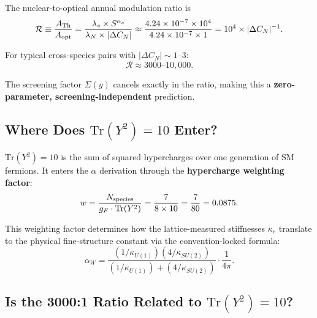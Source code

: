 \documentclass[11pt]{article}
\theoremstyle{definition}
\theoremstyle{remark}
\begin{document}
The nuclear-to-optical annual modulation ratio is
\begin{equation}\label{eq:ratio-master}
\mathcal{R} \equiv \frac{A_{\rm Th}}{A_{\rm opt}}
= \frac{\lambda_s \times S^{\alpha_s}}{\lambda_N \times |\Delta C_N|}
\approx \frac{4.24 \times 10^{-7} \times 10^4}
       {4.24 \times 10^{-7} \times 1}
= 10^4 \times |\Delta C_N|^{-1}.
\end{equation}

For typical cross-species pairs with $|\Delta C_N| \sim 1$--3:
\begin{equation}
\boxed{\mathcal{R} \approx 3000\text{--}10{,}000.}
\end{equation}

The screening factor $\Sigma(y)$ cancels exactly in the ratio, making this
a \textbf{zero-parameter, screening-independent} prediction.

\subsection{Where Does $\mathrm{Tr}(Y^2) = 10$ Enter?}

$\mathrm{Tr}(Y^2) = 10$ is the sum of squared hypercharges over one
generation of SM fermions. It enters the $\alpha$ derivation through the
\textbf{hypercharge weighting factor}:
\begin{equation}
w = \frac{N_{\rm species}}{g_F \cdot \mathrm{Tr}(Y^2)}
= \frac{7}{8 \times 10} = \frac{7}{80} = 0.0875.
\end{equation}

This weighting factor determines how the lattice-measured stiffnesses
$\kappa_r$ translate to the physical fine-structure constant via the
convention-locked formula:
\begin{equation}
\alpha_W = \frac{(1/\kappa_{U(1)})(4/\kappa_{SU(2)})}
{(1/\kappa_{U(1)}) + (4/\kappa_{SU(2)})} \cdot \frac{1}{4\pi}.
\end{equation}

\subsection{Is the 3000:1 Ratio Related to $\mathrm{Tr}(Y^2) = 10$?}
\end{document}
